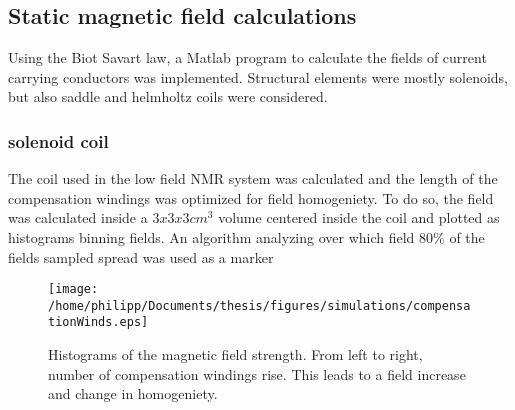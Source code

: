 		\subsection{Static magnetic field calculations}
			Using the Biot Savart law, a Matlab program to calculate the fields of current carrying conductors was implemented. Structural elements were mostly solenoids, but also saddle and helmholtz coils were considered.
			\subsubsection{solenoid coil}
				The coil used in the low field NMR system was calculated and the length of the compensation windings was optimized for field homogeniety. To do so, the field was calculated inside a $3 x 3 x 3 cm^3$ volume centered inside the coil and plotted as histograms binning fields. An algorithm analyzing over which field 80\% of the fields sampled spread was used as a marker
			\begin{figure}[b]
				\centering
				\texttt{[image: /home/philipp/Documents/thesis/figures/simulations/compensationWinds.eps]}
				\caption{Histograms of the magnetic field strength. From left to right, number of compensation windings rise. This leads to a field increase and change in homogeniety.}
			\end{figure}
%
